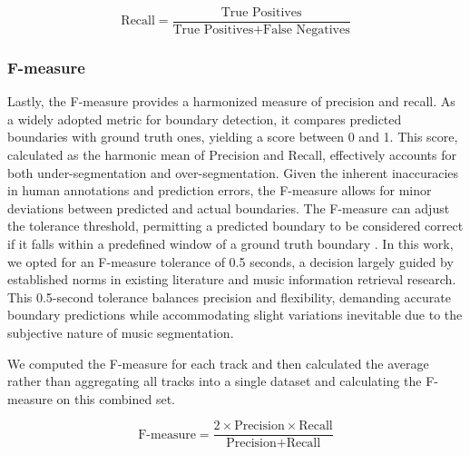 \begin{equation}
\text{Recall} = \frac{\text{True Positives}}{\text{True Positives} + \text{False Negatives}}
\end{equation}

\subsubsection{F-measure}

Lastly, the F-measure provides a harmonized measure of precision and recall. As a widely adopted metric for boundary detection, it compares predicted boundaries with ground truth ones, yielding a score between 0 and 1. This score, calculated as the harmonic mean of Precision and Recall, effectively accounts for both under-segmentation and over-segmentation. Given the inherent inaccuracies in human annotations and prediction errors, the F-measure allows for minor deviations between predicted and actual boundaries. The F-measure can adjust the tolerance threshold, permitting a predicted boundary to be considered correct if it falls within a predefined window of a ground truth boundary \cite{NietoPerceptualMusic, Turnbull2007ABOOSTING}. In this work, we opted for an F-measure tolerance of 0.5 seconds, a decision largely guided by established norms in existing literature and music information retrieval research. This 0.5-second tolerance balances precision and flexibility, demanding accurate boundary predictions while accommodating slight variations inevitable due to the subjective nature of music segmentation.

We computed the F-measure for each track and then calculated the average rather than aggregating all tracks into a single dataset and calculating the F-measure on this combined set.

\begin{equation}
\text{F-measure} = \frac{2 \times \text{Precision} \times \text{Recall}}{\text{Precision} + \text{Recall}}
\end{equation}

\newpage